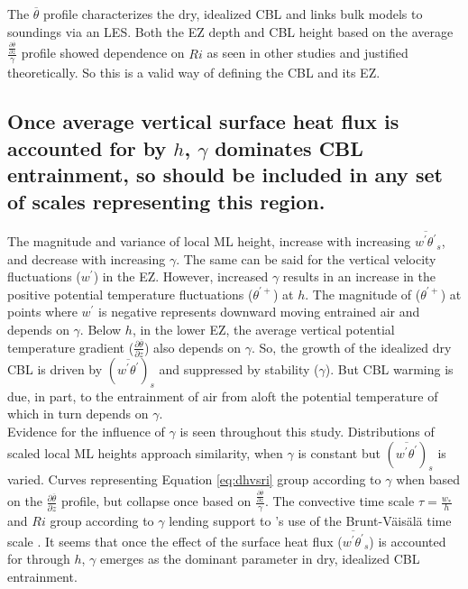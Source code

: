 The $\overline{\theta}$ profile characterizes the dry, idealized CBL and links bulk models to soundings via an LES.  Both the EZ depth and CBL height based on the average $\frac{\frac{\partial \overline{\theta}}{\partial z}}{\gamma}$ profile showed dependence on $Ri$ as seen in other studies and justified theoretically.  So this is a valid way of defining the CBL and its EZ.  

\subsection{Once average vertical surface heat flux is accounted for by $h$, $\gamma$ dominates CBL entrainment, so should be included in any set of scales representing this region.}

The magnitude and variance of local ML height, increase with increasing $\overline{w^{'}\theta^{'}}_{s}$, and decrease with increasing $\gamma$.  The same can be said for the vertical velocity fluctuations ($w^{'}$) in the EZ.  However, increased $\gamma$ results in an increase in the positive potential temperature fluctuations ($\theta^{'+}$) at $h$. The magnitude of ($\theta^{'+}$) at points where $w^{'}$ is negative represents downward moving entrained air and depends on $\gamma$.  Below $h$, in the lower EZ, the average vertical potential temperature gradient ($\frac{\partial \overline{\theta}}{\partial z}$) also depends on $\gamma$. So, the growth of the idealized dry CBL is driven by $(\overline{w^{'}\theta^{'}})_{s}$ and suppressed by stability ($\gamma$). But CBL warming is due, in part, to the entrainment of air from aloft the potential temperature of which in turn depends on $\gamma$.\\

Evidence for the influence of $\gamma$ is seen throughout this study.  Distributions of scaled local ML heights approach similarity, when $\gamma$ is constant but $(\overline{w^{'}\theta^{'}})_{s}$ is varied.  Curves representing Equation \ref{eq:dhvsri} group according to $\gamma$ when based on the $\frac{\partial \overline{\theta}}{\partial z}$ profile, but collapse once based on $\frac{\frac{\partial \overline{\theta}}{\partial z}}{\gamma}$.  The convective time scale $\tau = \frac{w_{*}}{h}$ and $Ri$ group according to $\gamma$ lending support to \cite{FedConzMir04}'s use of the Brunt-V{\"a}is{\"a}l{\"a} time scale \citep{NChap14}.  It seems that once the effect of the surface heat flux ($\overline{w^{'}\theta^{'}}_{s}$) is accounted for through $h$, $\gamma$ emerges as the dominant parameter in dry, idealized CBL entrainment.\\
 
